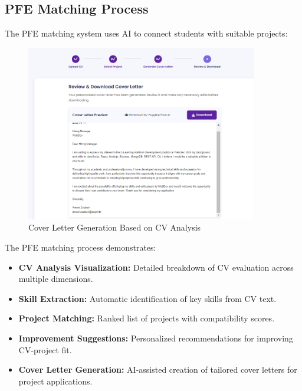 \documentclass[12pt,a4paper]{report}
\begin{document}
\subsection{PFE Matching Process}

The PFE matching system uses AI to connect students with suitable projects:

\begin{figure}[!htbp]
\centering
\includegraphics[width=0.9\textwidth]{media/cover letter.png}
\caption{Cover Letter Generation Based on CV Analysis}
\label{fig:cv-matching}
\end{figure}

The PFE matching process demonstrates:

\begin{itemize}
    \item \textbf{CV Analysis Visualization:} Detailed breakdown of CV evaluation across multiple dimensions.

    \item \textbf{Skill Extraction:} Automatic identification of key skills from CV text.

    \item \textbf{Project Matching:} Ranked list of projects with compatibility scores.

    \item \textbf{Improvement Suggestions:} Personalized recommendations for improving CV-project fit.

    \item \textbf{Cover Letter Generation:} AI-assisted creation of tailored cover letters for project applications.
\end{itemize}
\end{document}
